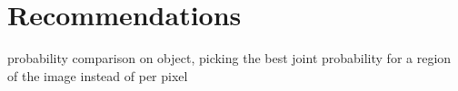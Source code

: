 \section{Recommendations}



{\color{red} probability comparison on object, picking the best joint probability for a region of the image instead of per pixel}